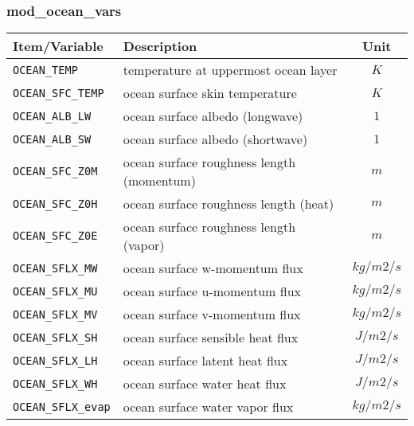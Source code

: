 \subsubsection{mod\_ocean\_vars}
 \begin{tabularx}{150mm}{|l|X|c|} \hline
 \rowcolor[gray]{0.9} Item/Variable & Description  & Unit \\\hline
  \verb|OCEAN_TEMP|      & temperature at uppermost ocean layer & $K$ \\\hline
  \verb|OCEAN_SFC_TEMP|  & ocean surface skin temperature       & $K$ \\\hline
  \verb|OCEAN_ALB_LW|    & ocean surface albedo (longwave)      & $1$ \\\hline
  \verb|OCEAN_ALB_SW|    & ocean surface albedo (shortwave)     & $1$ \\\hline
  \verb|OCEAN_SFC_Z0M|   & ocean surface roughness length (momentum) & $m$ \\\hline
  \verb|OCEAN_SFC_Z0H|   & ocean surface roughness length (heat)     & $m$ \\\hline
  \verb|OCEAN_SFC_Z0E|   & ocean surface roughness length (vapor)    & $m$ \\\hline
  \verb|OCEAN_SFLX_MW|   & ocean surface w-momentum flux        & $kg/m2/s$ \\\hline
  \verb|OCEAN_SFLX_MU|   & ocean surface u-momentum flux        & $kg/m2/s$ \\\hline
  \verb|OCEAN_SFLX_MV|   & ocean surface v-momentum flux        & $kg/m2/s$ \\\hline
  \verb|OCEAN_SFLX_SH|   & ocean surface sensible heat flux     & $J/m2/s$ \\\hline
  \verb|OCEAN_SFLX_LH|   & ocean surface latent heat flux       & $J/m2/s$ \\\hline
  \verb|OCEAN_SFLX_WH|   & ocean surface water heat flux        & $J/m2/s$ \\\hline
  \verb|OCEAN_SFLX_evap| & ocean surface water vapor flux       & $kg/m2/s$ \\\hline
 \end{tabularx}

